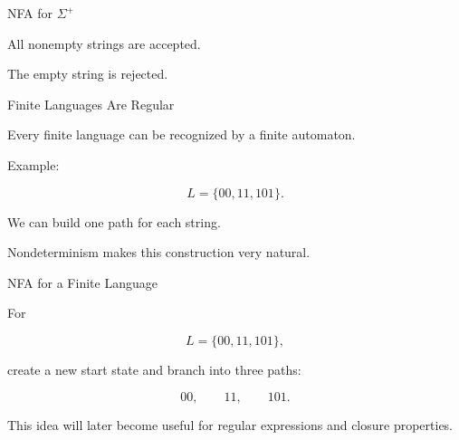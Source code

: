 \documentclass[10pt,aspectratio=169]{beamer}
\begin{document}
\begin{frame}{NFA for \(\Sigma^+\)}

\begin{center}
\end{center}

\vspace{1em}

All nonempty strings are accepted.

The empty string is rejected.

\end{frame}

\begin{frame}{Finite Languages Are Regular}

Every finite language can be recognized by a finite automaton.

\vspace{1em}

Example:

\[
L=\{00,11,101\}.
\]

\vspace{1em}

We can build one path for each string.

\pause

Nondeterminism makes this construction very natural.

\end{frame}

\begin{frame}{NFA for a Finite Language}

For

\[
L=\{00,11,101\},
\]

create a new start state and branch into three paths:

\[
00,\qquad 11,\qquad 101.
\]

\vspace{1em}

This idea will later become useful for regular expressions and closure properties.

\end{frame}
\end{document}
